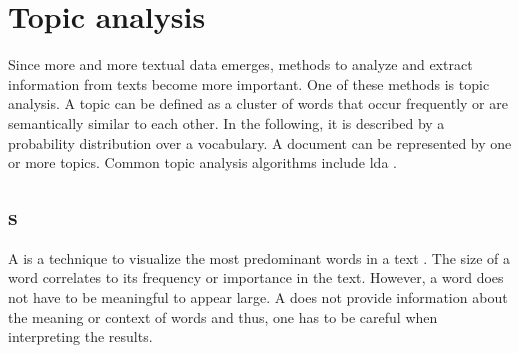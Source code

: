 \section{Topic analysis}\label{sec:topic-modeling}

Since more and more textual data emerges, methods to analyze and extract information from texts become more important.
One of these methods is topic analysis.
A topic can be defined as a cluster of words that occur frequently or are semantically similar to each other.
In the following, it is described by a probability distribution over a vocabulary.
A document can be represented by one or more topics. %
Common topic analysis algorithms include \ac{lda} \cite{topic_modeling2015}.







\subsection{\wordcloud{}s}\label{subsec:word-clouds}

A \wordcloud{} is a technique to visualize the most predominant words in a text \cite{topic_modeling2019}.
The size of a word correlates to its frequency or importance in the text.
However, a word does not have to be meaningful to appear large.
A \wordcloud{} does not provide information about the meaning or context of words and thus, 
one has to be careful when interpreting the results.